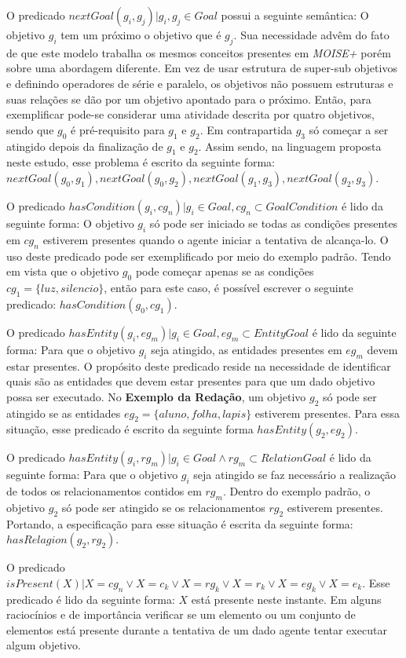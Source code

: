 O predicado $nextGoal(g_i,g_j) |g_i, g_j \in Goal$ possui a seguinte semântica: O objetivo $g_i$ tem um próximo o objetivo que 
é $g_j$. Sua necessidade advêm do fato de que este modelo trabalha os mesmos conceitos presentes em \textit{MOISE+} porém sobre
uma abordagem diferente. Em vez de usar estrutura de super-sub objetivos e definindo operadores de série e paralelo, os objetivos 
não possuem estruturas e suas relações se dão por um objetivo apontado para o próximo. Então, para exemplificar pode-se 
considerar uma atividade descrita por quatro objetivos, sendo que $g_0$ é pré-requisito para $g_1$ e $g_2$. Em contrapartida
$g_3$ só começar a ser atingido depois da finalização de $g_1$ e $g_2$. Assim sendo, na linguagem proposta neste estudo, 
esse problema é escrito da seguinte forma: $nextGoal(g_0,g_1), nextGoal(g_0,g_2), nextGoal(g_1,g_3), nextGoal(g_2,g_3)$.

O predicado $hasCondition(g_i,cg_n) | g_i \in Goal, cg_n \subset GoalCondition$ é lido da seguinte forma: O objetivo $g_i$ só pode 
ser iniciado se todas as condições presentes em $cg_n$ estiverem presentes quando o agente iniciar a tentativa de alcança-lo. 
O uso deste predicado pode ser exemplificado por meio do exemplo padrão. Tendo em vista que o objetivo $g_0$ pode começar apenas 
se as condições $cg_1 = \{ luz, silencio \}$, então para este caso, é possível escrever o seguinte predicado: $hasCondition(g_0,cg_1)$.

O predicado $hasEntity(g_i,eg_m) | g_i \in Goal, eg_m \subset EntityGoal $ é lido da seguinte forma: Para que o objetivo $g_i$ seja atingido, as entidades presentes em $eg_m$ devem estar presentes. O propósito deste predicado reside na necessidade de identificar quais são as entidades que devem estar presentes para que um dado objetivo possa ser executado. No \textbf{Exemplo da Redação}, um objetivo $g_2$ só pode ser 
atingido se as entidades $eg_2 = \{ aluno, folha, lapis\}$ estiverem presentes. Para essa situação, esse predicado é escrito da 
seguinte forma $hasEntity(g_2,eg_2)$.

O predicado $hasEntity(g_i,rg_m) | g_i \in Goal \wedge rg_m \subset RelationGoal $ é lido da seguinte forma: Para que o objetivo $g_i$
seja atingido se faz necessário a realização de todos os relacionamentos contidos em $rg_m$. Dentro do exemplo padrão, o objetivo 
$g_2$ só pode ser atingido se os relacionamentos $rg_2$ estiverem presentes. Portando, a especificação para esse situação é escrita
da seguinte forma: $hasRelagion(g_2,rg_2)$.

O predicado $isPresent(X) | X = cg_n \vee X = c_k \vee  X = rg_k \vee X = r_k \vee X = eg_k \vee X = e_k $. Esse predicado é lido 
da seguinte forma: $X$ está presente neste instante. Em alguns raciocínios e de importância verificar se um elemento ou um conjunto
de elementos está presente durante a tentativa de um dado agente tentar executar algum objetivo.

